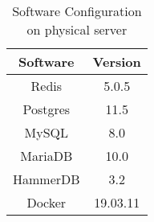 \begin{table}[H]
\centering
\begin{tabular}{|c|c|}
\hline
Software & Version \\ \hline
Redis    &  5.0.5  \\ \hline
Postgres &  11.5   \\ \hline
MySQL    &  8.0    \\ \hline
MariaDB  &  10.0      \\ \hline
HammerDB  &  3.2   \\ \hline
Docker & 19.03.11 \\ \hline
\end{tabular}
\caption{Software Configuration on physical server}
\label{Tab:softwareconfig}

\end{table}